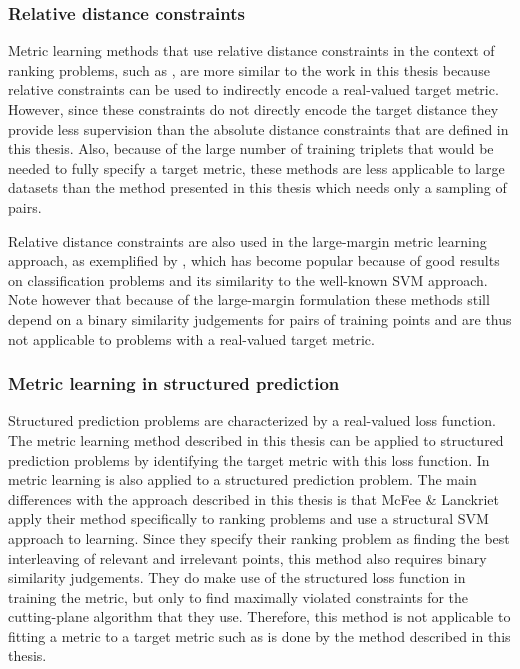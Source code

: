 \subsubsection{Relative distance constraints}

Metric learning methods that use relative distance constraints in the context of ranking problems, such as \cite{schultz2003learning}, are more similar to the work in this thesis because relative constraints can be used to indirectly encode a real-valued target metric. However, since these constraints do not directly encode the target distance they provide less supervision than the absolute distance constraints that are defined in this thesis. Also, because of the large number of training triplets that would be needed to fully specify a target metric, these methods are less applicable to large datasets than the method presented in this thesis which needs only a sampling of pairs.

Relative distance constraints are also used in the large-margin metric learning approach, as exemplified by \cite{weinberger2009distance, frome2007learning}, which has become popular because of good results on classification problems and its similarity to the well-known \ac{SVM} approach. Note however that because of the large-margin formulation these methods still depend on a binary similarity judgements for pairs of training points and are thus not applicable to problems with a real-valued target metric.


\subsubsection{Metric learning in structured prediction}

Structured prediction problems are characterized by a real-valued loss function. The metric learning method described in this thesis can be applied to structured prediction problems by identifying the target metric with this loss function. In\cite{mcfee2010metric} metric learning is also applied to a structured prediction problem. The main differences with the approach described in this thesis is that McFee \& Lanckriet apply their method specifically to ranking problems and use a structural \ac{SVM} approach to learning. Since they specify their ranking problem as finding the best interleaving of relevant and irrelevant points, this method also requires binary similarity judgements. They do make use of the structured loss function in training the metric, but only to find maximally violated constraints for the cutting-plane algorithm that they use. Therefore, this method is not applicable to fitting a metric to a target metric such as is done by the method described in this thesis.

